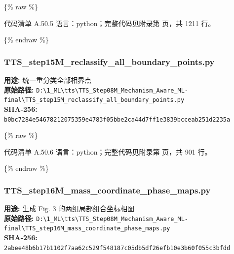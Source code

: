 \documentclass[lang=cn,scheme=chinese,color=blue,device=normal,toc=onecol,math=cm]{elegantbook}
\begin{document}
\{\% raw \%\}\par


\begin{codeindexbox}{代码清单 A.50.5}
语言：python；完整代码见附录第 \pageref{code:50:5} 页，共 1211 行。
\end{codeindexbox}


\{\% endraw \%\}\par


\subsubsection{TTS\_\allowbreak{}step15M\_\allowbreak{}reclassify\_\allowbreak{}all\_\allowbreak{}boundary\_\allowbreak{}points.py}


\textbf{用途:} 统一重分类全部相界点\\ \textbf{原始路径:} \texttt{D:\textbackslash{}\allowbreak{}1\_\allowbreak{}ML\textbackslash{}\allowbreak{}tts\textbackslash{}\allowbreak{}TTS\_\allowbreak{}Step08M\_\allowbreak{}Mechanism\_\allowbreak{}Aware\_\allowbreak{}ML-final\textbackslash{}\allowbreak{}TTS\_\allowbreak{}step15M\_\allowbreak{}reclassify\_\allowbreak{}all\_\allowbreak{}boundary\_\allowbreak{}points.py}\\ \textbf{SHA-256:} \texttt{b0bc7284e54678212075359e4783f05bbe2ca44d7ff1e3839bcceab251d2235a}\par


\{\% raw \%\}\par


\begin{codeindexbox}{代码清单 A.50.6}
语言：python；完整代码见附录第 \pageref{code:50:6} 页，共 901 行。
\end{codeindexbox}


\{\% endraw \%\}\par


\subsubsection{TTS\_\allowbreak{}step16M\_\allowbreak{}mass\_\allowbreak{}coordinate\_\allowbreak{}phase\_\allowbreak{}maps.py}


\textbf{用途:} 生成 Fig. 3 的两组局部组合坐标相图\\ \textbf{原始路径:} \texttt{D:\textbackslash{}\allowbreak{}1\_\allowbreak{}ML\textbackslash{}\allowbreak{}tts\textbackslash{}\allowbreak{}TTS\_\allowbreak{}Step08M\_\allowbreak{}Mechanism\_\allowbreak{}Aware\_\allowbreak{}ML-final\textbackslash{}\allowbreak{}TTS\_\allowbreak{}step16M\_\allowbreak{}mass\_\allowbreak{}coordinate\_\allowbreak{}phase\_\allowbreak{}maps.py}\\ \textbf{SHA-256:} \texttt{2abee48b6b17b1102f7aa62c529f548187c05db5df26efb10e3b60f055c3bfdd}\par
\end{document}
